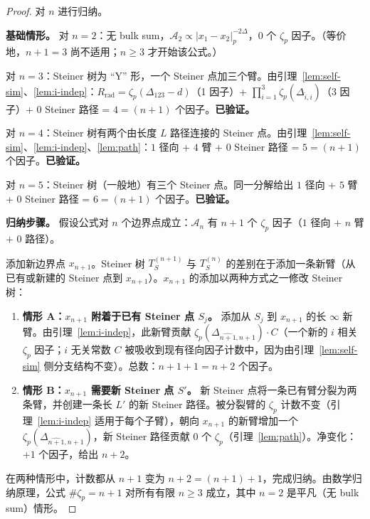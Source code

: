 \documentclass[11pt,a4paper]{ctexart}
\theoremstyle{remark}
\newcommand{\normp}[1]{|#1|_p}
\begin{document}
\begin{proof}
对 $n$ 进行归纳。

\textbf{基础情形。} 对 $n = 2$：无 bulk sum，$\mathcal{A}_2 \propto \normp{x_1 - x_2}^{-2\Delta}$，$0$ 个 $\zeta_p$ 因子。（等价地，$n{+}1 = 3$ 尚不适用；$n \geq 3$ 才开始该公式。）

对 $n = 3$：Steiner 树为 ``Y'' 形，一个 Steiner 点加三个臂。由引理~\ref{lem:self-sim}、\ref{lem:i-indep}：$R_{\mathrm{rad}} = \zeta_p(\Delta_{123} - d)$（1 因子）+ $\prod_{i=1}^3 \zeta_p(\Delta_{\hat{i},i})$（3 因子）+ $0$ Steiner 路径 = $4 = (n{+}1)$ 个因子。\textbf{已验证。}

对 $n = 4$：Steiner 树有两个由长度 $L$ 路径连接的 Steiner 点。由引理~\ref{lem:self-sim}、\ref{lem:i-indep}、\ref{lem:path}：$1$ 径向 + $4$ 臂 + $0$ Steiner 路径 = $5 = (n{+}1)$ 个因子。\textbf{已验证。}

对 $n = 5$：Steiner 树（一般地）有三个 Steiner 点。同一分解给出 $1$ 径向 + $5$ 臂 + $0$ Steiner 路径 = $6 = (n{+}1)$ 个因子。\textbf{已验证。}

\textbf{归纳步骤。} 假设公式对 $n$ 个边界点成立：$\mathcal{A}_n$ 有 $n{+}1$ 个 $\zeta_p$ 因子（$1$ 径向 $+$ $n$ 臂 $+$ $0$ 路径）。

添加新边界点 $x_{n+1}$。Steiner 树 $T_S^{(n+1)}$ 与 $T_S^{(n)}$ 的差别在于添加一条新臂（从已有或新建的 Steiner 点到 $x_{n+1}$）。$x_{n+1}$ 的添加以两种方式之一修改 Steiner 树：
\begin{enumerate}[leftmargin=2em]
    \item \textbf{情形 A：$x_{n+1}$ 附着于已有 Steiner 点 $S_j$。} 添加从 $S_j$ 到 $x_{n+1}$ 的长 $\infty$ 新臂。由引理~\ref{lem:i-indep}，此新臂贡献 $\zeta_p(\Delta_{\widehat{n+1}, n+1}) \cdot C$（一个新的 $i$ 相关 $\zeta_p$ 因子；$i$ 无关常数 $C$ 被吸收到现有径向因子计数中，因为由引理~\ref{lem:self-sim} 侧分支结构不变）。总数：$n{+}1 + 1 = n{+}2$ 个因子。
    \item \textbf{情形 B：$x_{n+1}$ 需要新 Steiner 点 $S'$。} 新 Steiner 点将一条已有臂分裂为两条臂，并创建一条长 $L'$ 的新 Steiner 路径。被分裂臂的 $\zeta_p$ 计数不变（引理~\ref{lem:i-indep} 适用于每个子臂），朝向 $x_{n+1}$ 的新臂增加一个 $\zeta_p(\Delta_{\widehat{n+1}, n+1})$，新 Steiner 路径贡献 $0$ 个 $\zeta_p$（引理~\ref{lem:path}）。净变化：$+1$ 个因子，给出 $n{+}2$。
\end{enumerate}

在两种情形中，计数都从 $n{+}1$ 变为 $n{+}2 = (n{+}1){+}1$，完成归纳。由数学归纳原理，公式 $\#\zeta_p = n{+}1$ 对所有有限 $n \geq 3$ 成立，其中 $n = 2$ 是平凡（无 bulk sum）情形。\qedhere
\end{proof}
\end{document}
